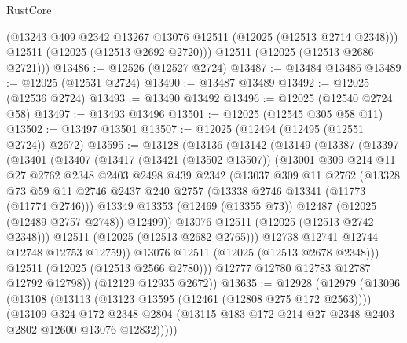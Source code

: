 \begin{lexlean}{RustCore}
\begin{coremodule}
        (@13243 @409 @2342 @13267 @13076 @12511 (@12025 (@12513 @2714 @2348)))
        @12511
        (@12025 (@12513 @2692 @2720)))
      @12511
      (@12025 (@12513 @2686 @2721)))
@13486 := @12526 (@12527 @2724)
@13487 := @13484 @13486
@13489 := @12025 (@12531 @2724)
@13490 := @13487 @13489
@13492 := @12025 (@12536 @2724)
@13493 := @13490 @13492
@13496 := @12025 (@12540 @2724 @58)
@13497 := @13493 @13496
@13501 := @12025 (@12545 @305 @58 @11)
@13502 := @13497 @13501
@13507 := @12025 (@12494 (@12495 (@12551 @2724)) @2672)
@13595 := @13128
    (@13136
      (@13142
        (@13149
          (@13387
            (@13397
              (@13401
                (@13407
                  (@13417
                    (@13421 (@13502 @13507))
                    (@13001
                      @309
                      @214
                      @11
                      @27
                      @2762
                      @2348
                      @2403
                      @2498
                      @439
                      @2342
                      (@13037
                        @309
                        @11
                        @2762
                        (@13328
                          @73
                          @59
                          @11
                          @2746
                          @2437
                          @240
                          @2757
                          (@13338 @2746 @13341 (@11773 (@11774 @2746)))
                          @13349
                          @13353
                          (@12469 (@13355 @73))
                          @12487
                          (@12025 (@12489 @2757 @2748))
                          @12499))
                      @13076
                      @12511
                      (@12025 (@12513 @2742 @2348)))
                    @12511
                    (@12025 (@12513 @2682 @2765)))
                  @12738
                  @12741
                  @12744
                  @12748
                  @12753
                  @12759))
              @13076
              @12511
              (@12025 (@12513 @2678 @2348)))
            @12511
            (@12025 (@12513 @2566 @2780)))
          @12777
          @12780
          @12783
          @12787
          @12792
          @12798))
      (@12129 @12935 @2672))
@13635 := @12928
    (@12979
      (@13096
        (@13108
          (@13113 (@13123 @13595 (@12461 (@12808 @275 @172 @2563))))
          (@13109
            @324
            @172
            @2348
            @2804
            (@13115 @183 @172 @214 @27 @2348 @2403 @2802 @12600 @13076 @12832)))))

\end{coremodule}
\end{lexlean}
